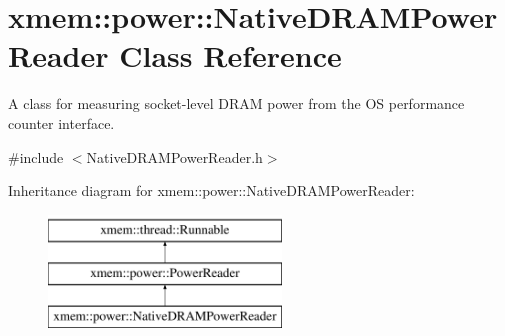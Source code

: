 \hypertarget{classxmem_1_1power_1_1_native_d_r_a_m_power_reader}{}\section{xmem\+:\+:power\+:\+:Native\+D\+R\+A\+M\+Power\+Reader Class Reference}
\label{classxmem_1_1power_1_1_native_d_r_a_m_power_reader}


A class for measuring socket-\/level D\+R\+A\+M power from the O\+S performance counter interface.  




{\ttfamily \#include $<$Native\+D\+R\+A\+M\+Power\+Reader.\+h$>$}

Inheritance diagram for xmem\+:\+:power\+:\+:Native\+D\+R\+A\+M\+Power\+Reader\+:\begin{figure}[H]
\begin{center}
\leavevmode
\includegraphics[height=3.000000cm]{classxmem_1_1power_1_1_native_d_r_a_m_power_reader}
\end{center}
\end{figure}
